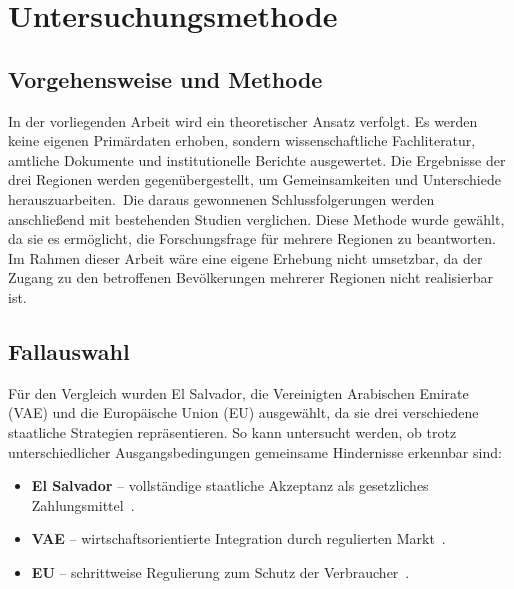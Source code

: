 \chapter{Untersuchungsmethode}
\label{chap:methode}

\section{Vorgehensweise und Methode}

In der vorliegenden Arbeit wird ein theoretischer Ansatz verfolgt. Es werden keine eigenen Primärdaten erhoben, sondern wissenschaftliche Fachliteratur, amtliche Dokumente und institutionelle Berichte ausgewertet. Die Ergebnisse der drei Regionen werden gegenübergestellt, um Gemeinsamkeiten und Unterschiede herauszuarbeiten. Die daraus gewonnenen Schlussfolgerungen werden anschließend mit bestehenden Studien verglichen. Diese Methode wurde gewählt, da sie es ermöglicht, die Forschungsfrage für mehrere Regionen zu beantworten. Im Rahmen dieser Arbeit wäre eine eigene Erhebung nicht umsetzbar, da der Zugang zu den betroffenen Bevölkerungen mehrerer Regionen nicht realisierbar ist.

\section{Fallauswahl}

Für den Vergleich wurden El Salvador, die Vereinigten Arabischen Emirate (VAE) und die Europäische Union (EU) ausgewählt, da sie drei verschiedene staatliche Strategien repräsentieren. So kann untersucht werden, ob trotz unterschiedlicher Ausgangsbedingungen gemeinsame Hindernisse erkennbar sind:

\begin{itemize}
    \item \textbf{El Salvador} -- vollständige staatliche Akzeptanz als gesetzliches
    Zahlungsmittel~\cite{Alvarez2023}.
    \item \textbf{VAE} -- wirtschaftsorientierte Integration durch regulierten
    Markt~\cite{VARA2025}.
    \item \textbf{EU} -- schrittweise Regulierung zum Schutz der
    Verbraucher~\cite{MiCA2023}.
\end{itemize}
